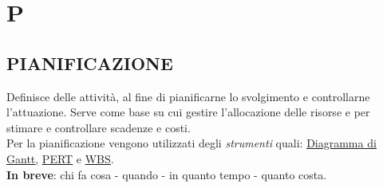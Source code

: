\newpage
	\section{P} \label{sec:P}


		\subsection{PIANIFICAZIONE}  \label{pianificazione}
		Definisce delle attività, al fine di pianificarne lo svolgimento e controllarne l’attuazione. Serve come base su cui gestire l’allocazione delle risorse e per stimare e controllare scadenze e costi. \\
		Per la pianificazione vengono utilizzati degli \textit{strumenti} quali: \underline{\hyperref[gantt]{Diagramma di Gantt}}, \underline{\hyperref[pert]{PERT}} e \underline{\hyperref[wbs]{WBS}}. \\
		\textbf{In breve}: chi fa cosa - quando - in quanto tempo - quanto costa.


